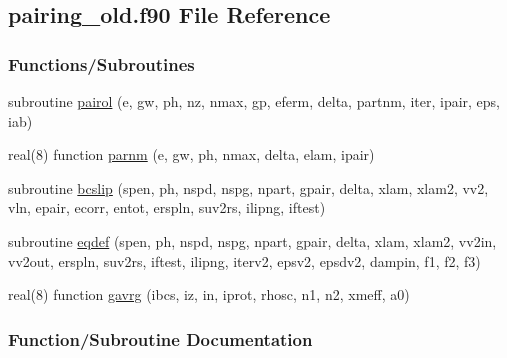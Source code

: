 \hypertarget{pairing__old_8f90}{}\subsection{pairing\+\_\+old.\+f90 File Reference}
\label{pairing__old_8f90}
\subsubsection*{Functions/\+Subroutines}
\begin{DoxyCompactItemize}
\item 
subroutine \hyperlink{pairing__old_8f90_a05b69f5283ced21de8af97403a9f9c2c}{pairol} (e, gw, ph, nz, nmax, gp, eferm, delta, partnm, iter, ipair, eps, iab)
\item 
real(8) function \hyperlink{pairing__old_8f90_a434bd6ba9fa05b19a1064003777cf149}{parnm} (e, gw, ph, nmax, delta, elam, ipair)
\item 
subroutine \hyperlink{pairing__old_8f90_a5ce6ee556df99741e0e4eadbe7b9c542}{bcslip} (spen, ph, nspd, nspg, npart, gpair, delta, xlam, xlam2, vv2, vln, epair, ecorr, entot, erspln, suv2rs, ilipng, iftest)
\item 
subroutine \hyperlink{pairing__old_8f90_a24a61029685989315857958523df49bd}{eqdef} (spen, ph, nspd, nspg, npart, gpair, delta, xlam, xlam2, vv2in, vv2out, erspln, suv2rs, iftest, ilipng, iterv2, epsv2, epsdv2, dampin, f1, f2, f3)
\item 
real(8) function \hyperlink{pairing__old_8f90_ab37f71472eaedec7d3acc55dd2d1a93f}{gavrg} (ibcs, iz, in, iprot, rhosc, n1, n2, xmeff, a0)
\end{DoxyCompactItemize}


\subsubsection{Function/\+Subroutine Documentation}
